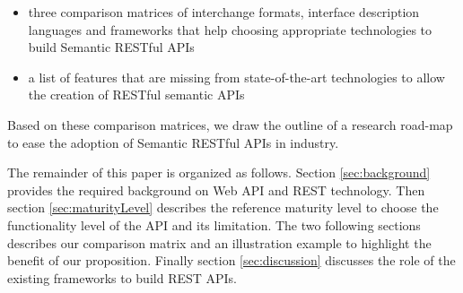 \begin{itemize}
    \item three comparison matrices of interchange formats, interface description languages and frameworks that help choosing appropriate technologies to build Semantic RESTful APIs
    \item a list of features that are missing from state-of-the-art technologies to allow the creation of RESTful semantic APIs
\end{itemize}

Based on these comparison matrices, we draw the outline of a research road-map to ease the adoption of Semantic RESTful APIs in industry.

The remainder of this paper is organized as follows. Section \ref{sec:background} provides the required background on Web API and REST technology. Then section \ref{sec:maturityLevel} describes the reference maturity level to choose the functionality level of the API and its limitation. The two following sections describes our comparison matrix and an illustration example to highlight the benefit of our proposition. Finally section \ref{sec:discussion} discusses the role of the existing frameworks to build REST APIs. 







